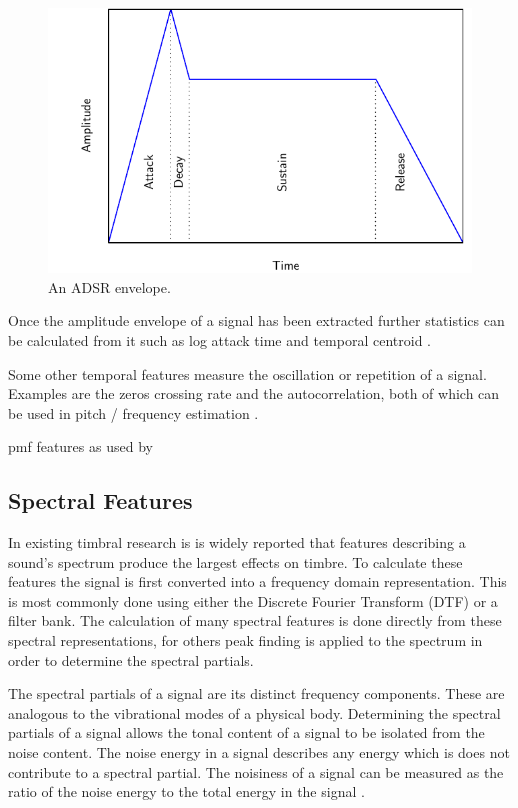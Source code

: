 		\begin{figure}[h!]
			\centering
			\includegraphics{chapter2/Images/ADSR.pdf}
			\caption{An ADSR envelope.}
			\label{fig:ADSR}
		\end{figure}

		Once the amplitude envelope of a signal has been extracted further statistics can be calculated from it such
		as log attack time and temporal centroid \citep{peeters2000instrument}.

		Some other temporal features measure the oscillation or repetition of a signal. Examples are the zeros
		crossing rate and the autocorrelation, both of which can be used in pitch / frequency estimation
		\citep{mcleod2005a}.

		\note
		{
			pmf features as used by \citet{wilson2014profiling}
		}

	\subsection{Spectral Features}
	\label{sec:Timbre-LowLevelFeatures-Spectral}
		In existing timbral research is is widely reported that features describing a sound's spectrum produce the
		largest effects on timbre. To calculate these features the signal is first converted into a frequency
		domain representation. This is most commonly done using either the Discrete Fourier Transform (DTF) or a
		filter bank. The calculation of many spectral features is done directly from these spectral representations,
		for others peak finding is applied to the spectrum in order to determine the spectral partials.

		The spectral partials of a signal are its distinct frequency components. These are analogous to the
		vibrational modes of a physical body. Determining the spectral partials of a signal allows the tonal content
		of a signal to be isolated from the noise content. The noise energy in a signal describes any energy which
		is does not contribute to a spectral partial. The noisiness of a signal can be measured as the ratio of the
		noise energy to the total energy in the signal \citep{serra1998sound}.

